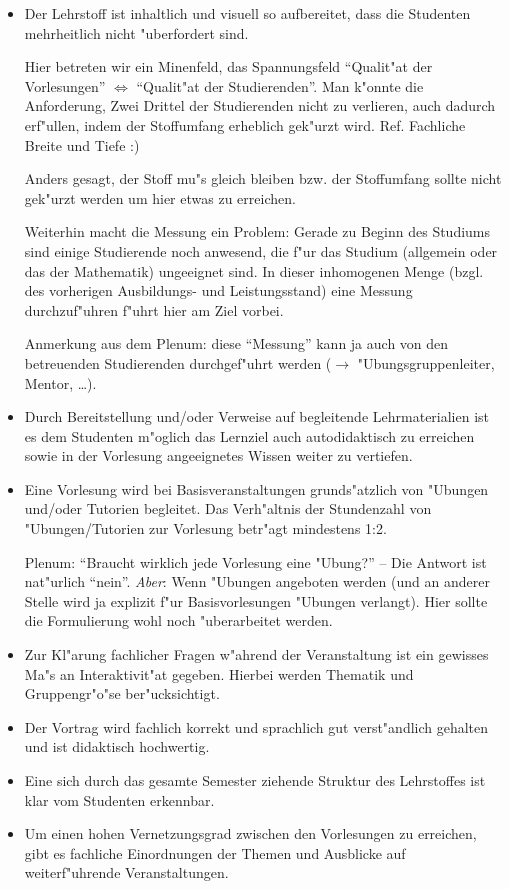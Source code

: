 \begin{itemize}
	\item Der Lehrstoff ist inhaltlich und visuell so aufbereitet, dass die Studenten
	mehrheitlich nicht "uberfordert sind.
\begin{kcmt}\begin{komacmt}
	Hier betreten wir ein Minenfeld, das Spannungsfeld "`Qualit"at der Vorlesungen"' $\Leftrightarrow$ "`Qualit"at
	der Studierenden"'. Man k"onnte die Anforderung, Zwei Drittel der Studierenden nicht zu verlieren, auch
	dadurch erf"ullen, indem der Stoffumfang erheblich gek"urzt wird. Ref. Fachliche Breite und Tiefe :)

	Anders gesagt, der Stoff mu"s gleich bleiben bzw. der Stoffumfang sollte nicht gek"urzt werden
	um hier etwas zu erreichen.

	Weiterhin macht die Messung ein Problem: Gerade zu Beginn des Studiums sind einige Studierende
	noch anwesend, die f"ur das Studium (allgemein oder das der Mathematik) ungeeignet sind. In dieser
	inhomogenen Menge (bzgl. des vorherigen Ausbildungs- und Leistungsstand) eine Messung durchzuf"uhren
	f"uhrt hier am Ziel vorbei.

	Anmerkung aus dem Plenum: diese "`Messung"' kann ja auch von den betreuenden Studierenden
	durchgef"uhrt werden ($\rightarrow$ "Ubungsgruppenleiter, Mentor, \dots).
\end{komacmt}\end{kcmt}
	\item Durch Bereitstellung und/oder Verweise auf begleitende Lehrmaterialien ist es dem Studenten
		m"oglich das Lernziel auch autodidaktisch zu erreichen sowie in der Vorlesung angeeignetes Wissen weiter zu
		vertiefen.
	\item Eine Vorlesung wird bei Basisveranstaltungen grunds"atzlich von "Ubungen und/oder Tutorien begleitet. Das Verh"altnis der Stundenzahl von "Ubungen/Tutorien zur Vorlesung betr"agt mindestens 1:2.
\begin{kcmt}\begin{komacmt}
	Plenum: "`Braucht wirklich jede Vorlesung eine "Ubung?"' -- Die Antwort ist nat"urlich "`nein"'.
	\emph{Aber}: Wenn "Ubungen angeboten werden (und an anderer Stelle wird ja explizit f"ur Basisvorlesungen
	"Ubungen verlangt). Hier sollte die Formulierung wohl noch "uberarbeitet werden.
\end{komacmt}\end{kcmt}
	\item Zur Kl"arung fachlicher Fragen w"ahrend der Veranstaltung ist ein gewisses Ma"s an Interaktivit"at gegeben. Hierbei werden Thematik und Gruppengr"o"se ber"ucksichtigt. 
	\item Der Vortrag wird fachlich korrekt und sprachlich gut verst"andlich gehalten und ist didaktisch hochwertig.
	\item Eine sich durch das gesamte Semester ziehende Struktur des Lehrstoffes ist klar vom Studenten erkennbar.
	\item Um einen hohen Vernetzungsgrad zwischen den Vorlesungen zu erreichen, gibt es fachliche Einordnungen der Themen und Ausblicke auf weiterf"uhrende Veranstaltungen. 
\end{itemize}

